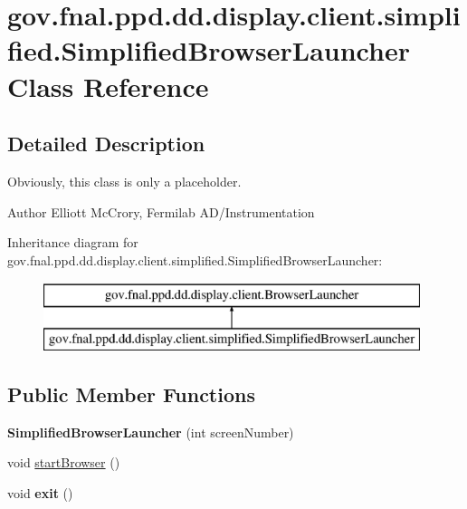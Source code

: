 \hypertarget{classgov_1_1fnal_1_1ppd_1_1dd_1_1display_1_1client_1_1simplified_1_1SimplifiedBrowserLauncher}{\section{gov.\-fnal.\-ppd.\-dd.\-display.\-client.\-simplified.\-Simplified\-Browser\-Launcher Class Reference}
\label{classgov_1_1fnal_1_1ppd_1_1dd_1_1display_1_1client_1_1simplified_1_1SimplifiedBrowserLauncher}
}


\subsection{Detailed Description}
Obviously, this class is only a placeholder.

\begin{DoxyAuthor}{Author}
Elliott Mc\-Crory, Fermilab A\-D/\-Instrumentation 
\end{DoxyAuthor}
Inheritance diagram for gov.\-fnal.\-ppd.\-dd.\-display.\-client.\-simplified.\-Simplified\-Browser\-Launcher\-:\begin{figure}[H]
\begin{center}
\leavevmode
\includegraphics[height=2.000000cm]{classgov_1_1fnal_1_1ppd_1_1dd_1_1display_1_1client_1_1simplified_1_1SimplifiedBrowserLauncher}
\end{center}
\end{figure}
\subsection*{Public Member Functions}
\begin{DoxyCompactItemize}
\item 
\hypertarget{classgov_1_1fnal_1_1ppd_1_1dd_1_1display_1_1client_1_1simplified_1_1SimplifiedBrowserLauncher_a1d6855890b2dec937d192ff285a93116}{{\bfseries Simplified\-Browser\-Launcher} (int screen\-Number)}\label{classgov_1_1fnal_1_1ppd_1_1dd_1_1display_1_1client_1_1simplified_1_1SimplifiedBrowserLauncher_a1d6855890b2dec937d192ff285a93116}

\item 
void \hyperlink{classgov_1_1fnal_1_1ppd_1_1dd_1_1display_1_1client_1_1simplified_1_1SimplifiedBrowserLauncher_a3c45c5bd1ba2dd6e5da7249ab728cc8a}{start\-Browser} ()
\item 
\hypertarget{classgov_1_1fnal_1_1ppd_1_1dd_1_1display_1_1client_1_1simplified_1_1SimplifiedBrowserLauncher_aaccf4b7866916cef5710eee260379831}{void {\bfseries exit} ()}\label{classgov_1_1fnal_1_1ppd_1_1dd_1_1display_1_1client_1_1simplified_1_1SimplifiedBrowserLauncher_aaccf4b7866916cef5710eee260379831}

\end{DoxyCompactItemize}
